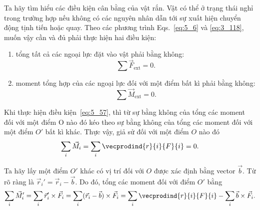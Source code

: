 Ta hãy tìm hiểu các điều kiện cân bằng của vật rắn. Vật có thể ở trạng thái nghỉ trong trường hợp nếu không có các nguyên nhân dẫn tới sự xuất hiện chuyển động tịnh tiến hoặc quay. Theo các phương trình Eqs.~\eqref{eq:5_6} và \eqref{eq:3_118}, muốn vậy cần và đủ phải thực hiện hai điều kiện:
\begin{enumerate}[(1)]
	\item tổng tất cả các ngoại lực đặt vào vật phải bằng không:%
	\begin{equation}\label{eq:5_57}
		\sum\vec{F}_{\text{ext}} = 0.
	\end{equation}

	\item moment tổng hợp của các ngoại lực đối với một điểm bất kì phải bằng không:%
	\begin{equation}\label{eq:5_58}
		\sum\vec{M}_{\text{ext}} = 0.
	\end{equation}
\end{enumerate}

Khi thực hiện điều kiện~\eqref{eq:5_57}, thì từ sự bằng không của tổng các moment đối với một điểm O nào đó kéo theo sự bằng không của tổng các moment đối với một điểm $O'$ bất kì khác. Thực vậy, giả sử đối với một điểm $O$ nào đó
\begin{equation}\label{eq:5_59}
	\sum_i\vec{M}_{i} = \sum_i\vecprodind{r}{i}{F}{i} = 0.
\end{equation}

\noindent
Ta hãy lấy một điểm $O'$ khác có vị trí đối với $O$ được xác định bằng vector $\vec{b}$. Từ  rõ ràng là $\vec{r}_i'=\vec{r}_i-\vec{b}$. Do đó, tổng các moment đối với điểm $O'$ bằng
\begin{equation*}
	\sum_i\vec{M}_{i}' = \sum_i \vec{r}_i'\times\vec{F}_i = \sum_i (\vec{r}_i-\vec{b})\times\vec{F}_i = \sum_i\vecprodind{r}{i}{F}{i} - \sum_i\vec{b}\times\vec{F}_i.
\end{equation*}

